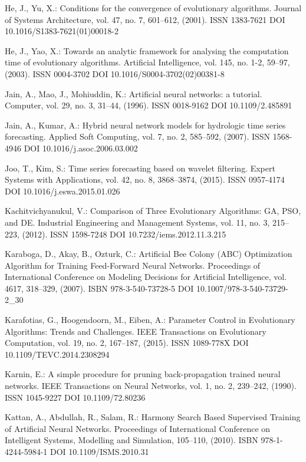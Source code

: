 \begin{thebibliography}{99.}
 He, J., Yu, X.: Conditions for the convergence of evolutionary algorithms. Journal of Systems Architecture, vol. 47, no. 7, 601--612, (2001). ISSN 1383-7621 DOI 10.1016/S1383-7621(01)00018-2

 He, J., Yao, X.: Towards an analytic framework for analysing the computation time of evolutionary algorithms. Artificial Intelligence, vol. 145, no. 1-2, 59--97, (2003). ISSN 0004-3702 DOI 10.1016/S0004-3702(02)00381-8

 Jain, A., Mao, J., Mohiuddin, K.: Artificial neural networks: a tutorial. Computer, vol. 29, no. 3, 31--44, (1996). ISSN 0018-9162 DOI 10.1109/2.485891

 Jain, A., Kumar, A.: Hybrid neural network models for hydrologic time series forecasting. Applied Soft Computing, vol. 7, no. 2, 585--592, (2007). ISSN 1568-4946 DOI 10.1016/j.asoc.2006.03.002

 Joo, T., Kim, S.: Time series forecasting based on wavelet filtering. Expert Systems with Applications, vol. 42, no. 8, 3868--3874, (2015). ISSN 0957-4174 DOI 10.1016/j.eswa.2015.01.026

 Kachitvichyanukul, V.: Comparison of Three Evolutionary Algorithms: GA, PSO, and DE. Industrial Engineering and Management Systems, vol. 11, no. 3, 215--223, (2012). ISSN 1598-7248 DOI 10.7232/iems.2012.11.3.215

 Karaboga, D., Akay, B., Ozturk, C.: Artificial Bee Colony (ABC) Optimization Algorithm for Training Feed-Forward Neural Networks. Proceedings of International Conference on Modeling Decisions for Artificial Intelligence, vol. 4617, 318--329, (2007). ISBN 978-3-540-73728-5 DOI 10.1007/978-3-540-73729-2\_30

 Karafotias, G., Hoogendoorn, M., Eiben, A.: Parameter Control in Evolutionary Algorithms: Trends and Challenges. IEEE Transactions on Evolutionary Computation, vol. 19, no. 2, 167--187, (2015). ISSN 1089-778X DOI 10.1109/TEVC.2014.2308294

 Karnin, E.: A simple procedure for pruning back-propagation trained neural networks. IEEE Transactions on Neural Networks, vol. 1, no. 2, 239--242, (1990). ISSN 1045-9227 DOI 10.1109/72.80236

 Kattan, A., Abdullah, R., Salam, R.: Harmony Search Based Supervised Training of Artificial Neural Networks. Proceedings of International Conference on Intelligent Systems, Modelling and Simulation, 105--110, (2010). ISBN 978-1-4244-5984-1 DOI 10.1109/ISMS.2010.31


\end{thebibliography}
